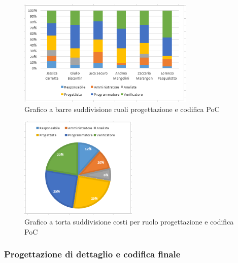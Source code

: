\begin{figure}[H]
    \centering
    \includegraphics[width=0.75\textwidth]{images/grafico_progPOC.png}
    \caption{Grafico a barre suddivisione ruoli progettazione e codifica PoC}
    \label{fig:grafico_progRTB}
\end{figure}

\begin{figure}[H]
    \centering
    \includegraphics[width=0.5\textwidth]{images/torta_progPOC.png}
    \caption{Grafico a torta suddivisione costi per ruolo progettazione e codifica PoC}
    \label{fig:torta_progRTB}
\end{figure}


\subsubsection{Progettazione di dettaglio e codifica finale}\label{sec:preventivo:periodi:dettaglio}


